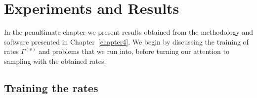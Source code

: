 \ifpdf
\graphicspath{{Chapter5/Figs/Raster/}{Chapter5/Figs/PDF/}{Chapter5/Figs/}}
\else
\graphicspath{{Chapter5/Figs/Vector/}{Chapter5/Figs/}}
\fi


\chapter{Experiments and Results}
\label{chapter5}
In the penultimate chapter we present results obtained from the methodology and software presented in Chapter~\ref{chapter4}. We begin by discussing the training of rates $\Gamma^{(v)}$ and problems that we run into, before turning our attention to sampling with the obtained rates.  

\section{Training the rates}
\label{sec:training_exp}

